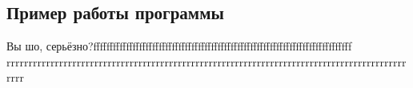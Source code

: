 \subsection{Пример работы программы}
Вы шо, серьёзно?fffffffffffffffffffffffffffffffffffffffffffffffffffffffffffffffffffffffffffffff
rrrrrrrrrrrrrrrrrrrrrrrrrrrrrrrrrrrrrrrrrrrrrrrrrrrrrrrrrrrrrrrrrrrrrrrrrrrrrrrrrrrrrrrrrrrrrrr